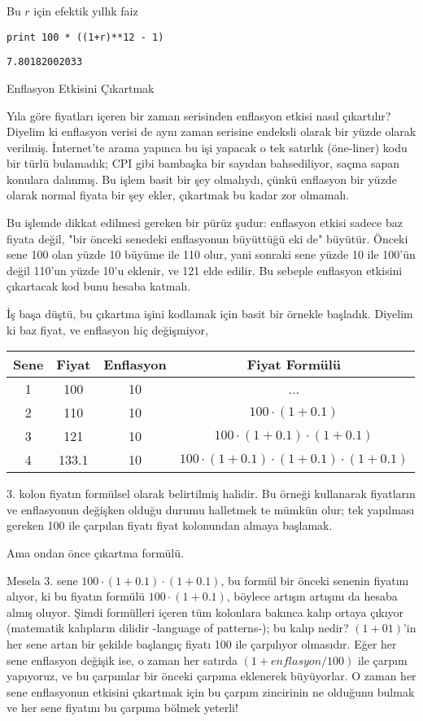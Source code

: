 \documentclass[12pt,fleqn]{article}\usepackage{../../common}
\begin{document}
Bu $r$ için efektik yıllık faiz

\begin{verbatim}
print 100 * ((1+r)**12 - 1)
\end{verbatim}

\begin{verbatim}
7.80182002033
\end{verbatim}

Enflasyon Etkisini Çıkartmak

Yıla göre fiyatları içeren bir zaman serisinden enflasyon etkisi nasıl
çıkartılır? Diyelim ki enflasyon verisi de aynı zaman serisine endeksli
olarak bir yüzde olarak verilmiş. İnternet'te arama yapınca bu işi yapacak
o tek satırlık (öne-liner) kodu bir türlü bulamadık; CPI gibi bambaşka bir
sayıdan bahsediliyor, saçma sapan konulara dalınmış. Bu işlem basit bir şey
olmalıydı, çünkü enflasyon bir yüzde olarak normal fiyata bir şey ekler,
çıkartmak bu kadar zor olmamalı.

Bu işlemde dikkat edilmesi gereken bir pürüz şudur: enflasyon etkisi sadece
baz fiyata değil, "bir önceki senedeki enflasyonun büyüttüğü eki de"
büyütür. Önceki sene 100 olan yüzde 10 büyüme ile 110 olur, yani sonraki
sene yüzde 10 ile 100'ün değil 110'un yüzde 10'u eklenir, ve 121 elde
edilir. Bu sebeple enflasyon etkisini çıkartacak kod bunu hesaba katmalı.

İş başa düştü, bu çıkartma işini kodlamak için basit bir örnekle
başladık. Diyelim ki baz fiyat, ve enflasyon hiç değişmiyor,

\begin{tabular}{c | c | c | c}
Sene & Fiyat & Enflasyon & Fiyat Formülü \\
\hline
1 & 100 & 10 & ... \\
2 &   110  &   10   & $100 \cdot (1+0.1)$ \\
3 &   121   &  10   & $100 \cdot (1+0.1) \cdot (1+0.1)$ \\
4 &   133.1 &  10   & $100 \cdot (1+0.1) \cdot (1+0.1) \cdot (1+0.1) $
\end{tabular}

3. kolon fiyatın formülsel olarak belirtilmiş halidir. Bu örneği kullanarak
fiyatların ve enflasyonun değişken olduğu durumu halletmek te mümkün olur;
tek yapılması gereken 100 ile çarpılan fiyatı fiyat kolonundan almaya
başlamak.

Ama ondan önce çıkartma formülü.

Mesela 3. sene $100 \cdot (1+0.1) \cdot (1+0.1)$, bu formül bir önceki
senenin fiyatını alıyor, ki bu fiyatın formülü $100 \cdot (1+0.1)$, böylece
artışın artışını da hesaba almış oluyor. Şimdi formülleri içeren tüm
kolonlara bakınca kalıp ortaya çıkıyor (matematik kalıpların dilidir
-language of patterns-); bu kalıp nedir? $(1+01)$'in her sene artan bir
şekilde başlangıç fiyatı 100 ile çarpılıyor olmasıdır. Eğer her sene
enflasyon değişik ise, o zaman her satırda $(1+enflasyon/100)$ ile çarpım
yapıyoruz, ve bu çarpımlar bir önceki çarpıma eklenerek büyüyorlar. O zaman
her sene enflasyonun etkisini çıkartmak için bu çarpım zincirinin ne
olduğunu bulmak ve her sene fiyatını bu çarpıma bölmek yeterli!
\end{document}
